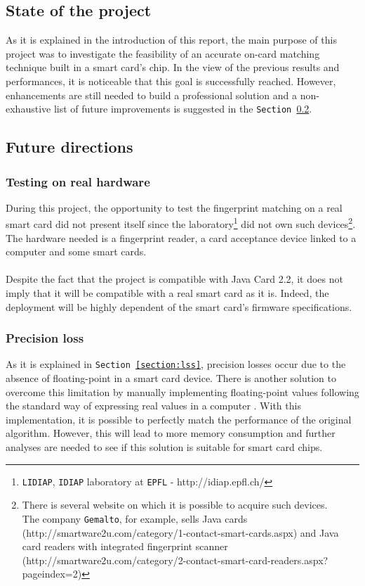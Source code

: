 \documentclass[a4paper,12pt]{article}
\begin{document}
\subsection{State of the project}
As it is explained in the introduction of this report, the main purpose of this project was to investigate the feasibility of an accurate on-card matching technique built in a smart card's chip. In the view of the previous results and performances, it is noticeable that this goal is successfully reached. However, enhancements are still needed to build a professional solution and a non-exhaustive list of future improvements is suggested in the \texttt{Section \ref{improvements}}.

\subsection{Future directions}
\label{improvements}
\subsubsection{Testing on real hardware}
During this project, the opportunity to test the fingerprint matching on a real smart card did not present itself since the laboratory\footnote{\texttt{LIDIAP}, \texttt{IDIAP} laboratory at \texttt{EPFL} - http://idiap.epfl.ch/} did not own such devices\footnote{There is several website on which it is possible to acquire such devices.\\The company \texttt{Gemalto}, for example, sells Java cards (http://smartware2u.com/category/1-contact-smart-cards.aspx) and Java card readers with integrated fingerprint scanner (http://smartware2u.com/category/2-contact-smart-card-readers.aspx?pageindex=2)}. The hardware needed is a fingerprint reader, a card acceptance device linked to a computer and some smart cards.\\\\
Despite the fact that the project is compatible with Java Card 2.2, it does not imply that it will be compatible with a real smart card as it is. Indeed, the deployment will be highly dependent of the smart card's firmware specifications.

\subsubsection{Precision loss}
As it is explained in \texttt{Section \ref{section:lss}}, precision losses occur due to the absence of floating-point in a smart card device. There is another solution to overcome this limitation by manually implementing floating-point values following the standard way of expressing real values in a computer \cite{isofloatingpoints}. With this implementation, it is possible to perfectly match the performance of the original algorithm. However, this will lead to more memory consumption and further analyses are needed to see if this solution is suitable for smart card chips.
\end{document}
